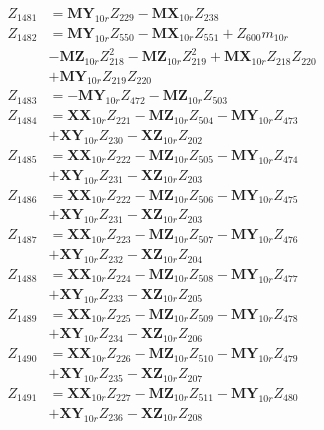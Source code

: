 \begin{multicols}{2}
\begin{align}
Z_{1481} &= \mathbf{MY}_{10r}Z_{229} - \mathbf{MX}_{10r}Z_{238} \nonumber \\
Z_{1482} &= \mathbf{MY}_{10r}Z_{550} - \mathbf{MX}_{10r}Z_{551} + Z_{600}m_{10r}  \nonumber \\
&- \mathbf{MZ}_{10r}Z_{218}^2 - \mathbf{MZ}_{10r}Z_{219}^2 + \mathbf{MX}_{10r}Z_{218}Z_{220}  \nonumber \\
&+ \mathbf{MY}_{10r}Z_{219}Z_{220} \nonumber \\
Z_{1483} &= - \mathbf{MY}_{10r}Z_{472} - \mathbf{MZ}_{10r}Z_{503} \nonumber \\
Z_{1484} &= \mathbf{XX}_{10r}Z_{221} - \mathbf{MZ}_{10r}Z_{504} - \mathbf{MY}_{10r}Z_{473}  \nonumber \\
&+ \mathbf{XY}_{10r}Z_{230} - \mathbf{XZ}_{10r}Z_{202} \nonumber \\
Z_{1485} &= \mathbf{XX}_{10r}Z_{222} - \mathbf{MZ}_{10r}Z_{505} - \mathbf{MY}_{10r}Z_{474}  \nonumber \\
&+ \mathbf{XY}_{10r}Z_{231} - \mathbf{XZ}_{10r}Z_{203} \nonumber \\
Z_{1486} &= \mathbf{XX}_{10r}Z_{222} - \mathbf{MZ}_{10r}Z_{506} - \mathbf{MY}_{10r}Z_{475}  \nonumber \\
&+ \mathbf{XY}_{10r}Z_{231} - \mathbf{XZ}_{10r}Z_{203} \nonumber \\
Z_{1487} &= \mathbf{XX}_{10r}Z_{223} - \mathbf{MZ}_{10r}Z_{507} - \mathbf{MY}_{10r}Z_{476}  \nonumber \\
&+ \mathbf{XY}_{10r}Z_{232} - \mathbf{XZ}_{10r}Z_{204} \nonumber \\
Z_{1488} &= \mathbf{XX}_{10r}Z_{224} - \mathbf{MZ}_{10r}Z_{508} - \mathbf{MY}_{10r}Z_{477}  \nonumber \\
&+ \mathbf{XY}_{10r}Z_{233} - \mathbf{XZ}_{10r}Z_{205} \nonumber \\
Z_{1489} &= \mathbf{XX}_{10r}Z_{225} - \mathbf{MZ}_{10r}Z_{509} - \mathbf{MY}_{10r}Z_{478}  \nonumber \\
&+ \mathbf{XY}_{10r}Z_{234} - \mathbf{XZ}_{10r}Z_{206} \nonumber \\
Z_{1490} &= \mathbf{XX}_{10r}Z_{226} - \mathbf{MZ}_{10r}Z_{510} - \mathbf{MY}_{10r}Z_{479}  \nonumber \\
&+ \mathbf{XY}_{10r}Z_{235} - \mathbf{XZ}_{10r}Z_{207} \nonumber \\
Z_{1491} &= \mathbf{XX}_{10r}Z_{227} - \mathbf{MZ}_{10r}Z_{511} - \mathbf{MY}_{10r}Z_{480}  \nonumber \\
&+ \mathbf{XY}_{10r}Z_{236} - \mathbf{XZ}_{10r}Z_{208} \nonumber \\

\end{align}
\end{multicols}
